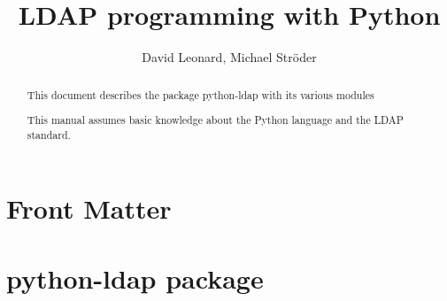 \documentclass{manual}
\title{LDAP programming with Python}
\author{David Leonard, Michael Str\"oder}
\begin{document}
\maketitle

\ifhtml
\chapter*{Front Matter\label{front}}
\fi

\begin{abstract}
\noindent
This document describes the package python-ldap with its various modules

This manual assumes basic knowledge about the Python language and the
LDAP standard.
\end{abstract}

\tableofcontents

\chapter{python-ldap package}












\renewcommand{\indexname}{Module Index}

\renewcommand{\indexname}{Index}
\end{document}
